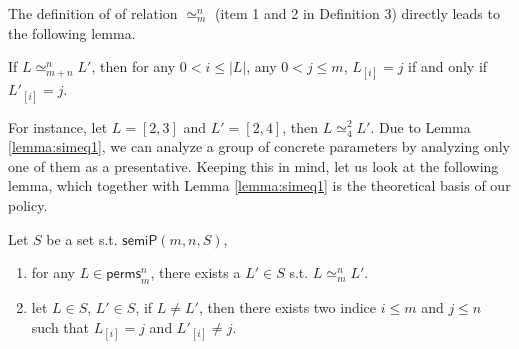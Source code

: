 \documentclass[final]{IEEEtran}
\newcommand\lyj[1]{\textcolor{magenta}{lyj: #1}}
\newcommand\cai[1]{\textcolor{blue}{ #1} }
\newcommand\caicomment[1]{\textcolor{red}{comment: #1} }
\begin{document}
{The definition of of relation $\simeq_m^n$ (item 1 and 2 in Definition 3) directly leads to the following lemma. %




\begin{lemma}\label{lemma:simeq1}%
If $L \simeq_{m+n}^n L' $, then for any $0<i\le |L|$, any $0<j \le m$, $L_{[i]}=j$ if and only if $L'_{[i]}=j$.
\end{lemma}

For instance, let $L=[2,3]$ and $L'=[2,4]$, then $L \simeq_{4}^2 L' $. %
Due to Lemma \ref{lemma:simeq1},
we can analyze a group of concrete parameters by analyzing only one of them as a presentative. Keeping this in mind, let us look at the following lemma, which together with Lemma \ref{lemma:simeq1} is the theoretical basis of our policy.


\begin{lemma}\label{lemma:simeqQuotinent}  Let $S $ be a set s.t.  $\mathsf{semiP}(m,n,S)$,
\begin{enumerate}
\item \label{complete}  for any $L \in \mathsf{perms}_{m}^{n}$, there exists a $L' \in S$ s.t. $L \simeq_m^n L'$.
\item \label{distinct} let $L \in S$, $L' \in S$, if $L \ne L'$, then there exists two indice $i \le m$ and $j \le n$ such that $L_{[i]}=j$ and $L'_{[i]}\ne j$.
\end{enumerate}
\end{lemma}

}
\end{document}
